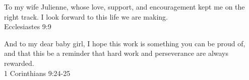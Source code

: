 %
%
%

\begin{dedication}
To my wife Julienne, whose love, support, and encouragement kept me on the right track. I look forward to this life we are making. \\ 
Ecclesiastes 9:9

\vspace*{2cm}

And to my dear baby girl, I hope this work is something you can be proud of, and that this be a reminder that hard work and perseverance are always rewarded. \\
1 Corinthians 9:24-25
\end{dedication}

\pagebreak